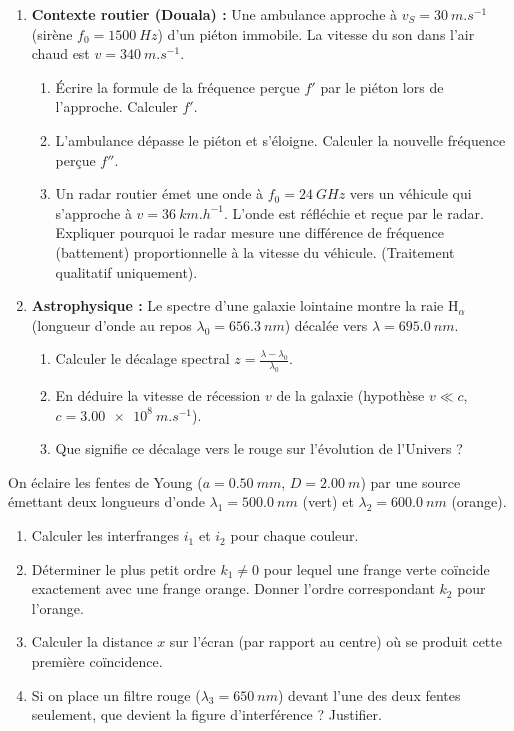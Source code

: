 \documentclass[11pt]{article}
\begin{document}
\begin{exercice}
\begin{enumerate}
    \item \textbf{Contexte routier (Douala) :} Une ambulance approche à $v_S = \SI{30}{m.s^{-1}}$ (sirène $f_0 = \SI{1500}{Hz}$) d'un piéton immobile. La vitesse du son dans l'air chaud est $v = \SI{340}{m.s^{-1}}$.
    \begin{enumerate}
        \item Écrire la formule de la fréquence perçue $f'$ par le piéton lors de l'approche. Calculer $f'$.
        \item L'ambulance dépasse le piéton et s'éloigne. Calculer la nouvelle fréquence perçue $f''$.
        \item Un radar routier émet une onde à $f_0 = \SI{24}{GHz}$ vers un véhicule qui s'approche à $v = \SI{36}{km.h^{-1}}$. L'onde est réfléchie et reçue par le radar. Expliquer pourquoi le radar mesure une différence de fréquence (battement) proportionnelle à la vitesse du véhicule. (Traitement qualitatif uniquement).
    \end{enumerate}
    \item \textbf{Astrophysique :} Le spectre d'une galaxie lointaine montre la raie H$_\alpha$ (longueur d'onde au repos $\lambda_0 = \SI{656,3}{nm}$) décalée vers $\lambda = \SI{695,0}{nm}$.
    \begin{enumerate}
        \item Calculer le décalage spectral $z = \frac{\lambda - \lambda_0}{\lambda_0}$.
        \item En déduire la vitesse de récession $v$ de la galaxie (hypothèse $v \ll c$, $c = \SI{3,00e8}{m.s^{-1}}$).
        \item Que signifie ce décalage vers le rouge sur l'évolution de l'Univers ?
    \end{enumerate}
\end{enumerate}
\end{exercice}

\begin{exercice}
On éclaire les fentes de Young ($a = \SI{0,50}{mm}$, $D = \SI{2,00}{m}$) par une source émettant deux longueurs d'onde $\lambda_1 = \SI{500,0}{nm}$ (vert) et $\lambda_2 = \SI{600,0}{nm}$ (orange).
\begin{enumerate}
    \item Calculer les interfranges $i_1$ et $i_2$ pour chaque couleur.
    \item Déterminer le plus petit ordre $k_1 \neq 0$ pour lequel une frange verte coïncide exactement avec une frange orange. Donner l'ordre correspondant $k_2$ pour l'orange.
    \item Calculer la distance $x$ sur l'écran (par rapport au centre) où se produit cette première coïncidence.
    \item Si on place un filtre rouge ($\lambda_3 = \SI{650}{nm}$) devant l'une des deux fentes seulement, que devient la figure d'interférence ? Justifier.
\end{enumerate}
\end{exercice}
\end{document}
